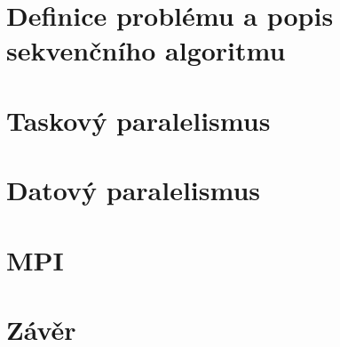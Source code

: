 \section{Definice problému a popis sekvenčního algoritmu}


\section{Taskový paralelismus}


\section{Datový paralelismus}


\section{MPI}


\section{Závěr}

